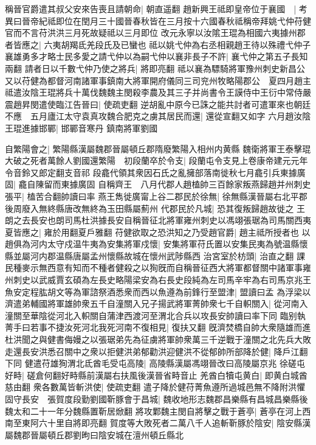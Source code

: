 稱晉官爵遣其叔父安來告喪且請朝命|{
	朝直遥翻}
趙新興王祗即皇帝位于襄國　|{
	考異曰晉帝紀祗即位在閏月三十國晉春秋皆在三月按十六國春秋祗稱帝拜姚弋仲苻健官而不言苻洪洪三月死故疑祗以三月即位}
改元永寧以汝隂王琨為相國六夷據州郡者皆應之|{
	六夷胡羯氐羌段氏及已蠻也}
祗以姚弋仲為右丞相親趙王待以殊禮弋仲子襄雄勇多才略士民多愛之請弋仲以為嗣弋仲以襄非長子不許|{
	襄弋仲之第五子長知兩翻}
請者日以千數弋仲乃使之將兵|{
	將即亮翻}
祗以襄為驃騎將軍豫州刺史新昌公又以苻健為都督河南諸軍事鎮南大將軍開府儀同三司兖州牧略陽郡公　夏四月趙主祗遣汝陰王琨將兵十萬伐魏魏主閔殺李農及其三子并尚書令王謨侍中王衍中常侍嚴震趙昇閔遣使臨江告晉曰|{
	使疏吏翻}
逆胡亂中原今已誅之能共討者可遣軍來也朝廷不應　五月廬江太守袁真攻魏合肥克之虜其居民而還|{
	還從宣翻又如字}
六月趙汝陰王琨進據邯鄲|{
	邯鄲音寒丹}
鎮南將軍劉國

自繁陽會之|{
	繁陽縣漢屬魏郡晉屬頓丘郡隋廢繁陽入相州内黄縣}
魏衛將軍王泰擊琨大破之死者萬餘人劉國還繁陽　初段蘭卒於令支|{
	段蘭屯令支見上卷康帝建元元年令音鈴又郎定翻支音祁}
段龕代領其衆因石氏之亂擁部落南徙秋七月龕引兵東據廣固|{
	龕自陳留而東據廣固}
自稱齊王　八月代郡人趙榼帥三百餘家叛燕歸趙并州刺史張平|{
	榼苦合翻帥讀曰率}
燕王雋徙廣甯上谷二郡民於徐無|{
	徐無縣漢晉屬右北平郡後周廢入無終縣唐改無終為玉田縣屬薊州}
代郡民於凡城|{
	恐其復叛歸趙故徙之}
王朗之去長安也朗司馬杜洪據長安自稱晉征北將軍雍州刺史以馮翊張琚為司馬關西夷夏皆應之|{
	雍於用翻夏戶雅翻}
苻健欲取之恐洪知之乃受趙官爵|{
	趙主祗所授者也}
以趙俱為河内太守戍温牛夷為安集將軍戍懷|{
	安集將軍苻氏置以安集民夷為號温縣懷縣並屬河内郡温縣唐屬孟州懷縣故城在懷州武陟縣西}
治宮室於枋頭|{
	治直之翻}
課民種麥示無西意有知而不種者健殺之以狥旣而自稱晉征西大將軍都督關中諸軍事雍州刺史以武威賈玄碩為左長史略陽梁安為右長史段純為左司馬辛牢為右司馬京兆王魚安定程肱胡文等為軍諮祭酒悉衆而西以魚遵為前鋒行至盟津|{
	盟讀曰孟}
為浮梁以濟遣弟輔國將軍雄帥衆五千自潼關入兄子揚武將軍菁帥衆七千自軹關入|{
	從河南入潼關至華陰從河北入軹關自蒲津西渡河至渭北合兵以攻長安帥讀曰率下同}
臨别執菁手曰若事不捷汝死河北我死河南不復相見|{
	復扶又翻}
旣濟焚橋自帥大衆隨雄而進杜洪聞之與健書侮嫚之以張琚弟先為征虜將軍帥衆萬三千逆戰于潼關之北先兵大敗走還長安洪悉召關中之衆以拒健洪弟郁勸洪迎健洪不從郁帥所部降於健|{
	降戶江翻下同}
健遣苻雄狥渭北氐酋毛受屯高陵|{
	高陵縣漢屬馮翊晉改曰高陵屬京兆}
徐磋屯好畤|{
	磋倉何翻好畤縣前漢屬右扶風後漢晉省畤音止}
羌酋白犢屯黄白|{
	即黄白城酋慈由翻}
衆各數萬皆斬洪使|{
	使疏吏翻}
遣子降於健苻菁魚遵所過城邑無不降附洪懼固守長安　張賀度段勤劉國靳豚會于昌城|{
	魏收地形志魏郡昌樂縣有昌城昌樂縣後魏太和二十一年分魏縣置靳居焮翻}
將攻鄴魏主閔自將擊之戰于蒼亭|{
	蒼亭在河上西南至東阿六十里自將即亮翻}
賀度等大敗死者二萬八千人追斬靳豚於陰安|{
	陰安縣漢屬魏郡晉屬頓丘郡劉昫曰陰安城在澶州頓丘縣北}
